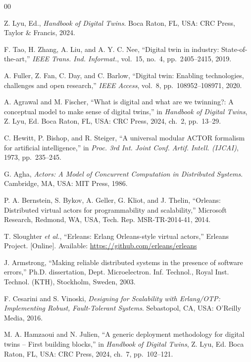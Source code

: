 \documentclass[conference]{IEEEtran}
\begin{document}
\begin{thebibliography}{00}

 Z. Lyu, Ed., \emph{Handbook of Digital Twins}. Boca Raton, FL, USA: CRC Press, Taylor \& Francis, 2024.

 F. Tao, H. Zhang, A. Liu, and A. Y. C. Nee, ``Digital twin in industry: State-of-the-art,'' \emph{IEEE Trans. Ind. Informat.}, vol.~15, no.~4, pp.~2405--2415, 2019.

 A. Fuller, Z. Fan, C. Day, and C. Barlow, ``Digital twin: Enabling technologies, challenges and open research,'' \emph{IEEE Access}, vol.~8, pp.~108952--108971, 2020.

 A. Agrawal and M. Fischer, ``What is digital and what are we twinning?: A conceptual model to make sense of digital twins,'' in \emph{Handbook of Digital Twins}, Z. Lyu, Ed. Boca Raton, FL, USA: CRC Press, 2024, ch.~2, pp.~13--29.

 C. Hewitt, P. Bishop, and R. Steiger, ``A universal modular ACTOR formalism for artificial intelligence,'' in \emph{Proc. 3rd Int. Joint Conf. Artif. Intell. (IJCAI)}, 1973, pp.~235--245.

 G. Agha, \emph{Actors: A Model of Concurrent Computation in Distributed Systems}. Cambridge, MA, USA: MIT Press, 1986.

 P. A. Bernstein, S. Bykov, A. Geller, G. Kliot, and J. Thelin, ``Orleans: Distributed virtual actors for programmability and scalability,'' Microsoft Research, Redmond, WA, USA, Tech. Rep. MSR-TR-2014-41, 2014.

 T. Sloughter \emph{et al.}, ``Erleans: Erlang Orleans-style virtual actors,'' Erleans Project. [Online]. Available: \url{https://github.com/erleans/erleans}

 J. Armstrong, ``Making reliable distributed systems in the presence of software errors,'' Ph.D. dissertation, Dept. Microelectron. Inf. Technol., Royal Inst. Technol. (KTH), Stockholm, Sweden, 2003.

 F. Cesarini and S. Vinoski, \emph{Designing for Scalability with Erlang/OTP: Implementing Robust, Fault-Tolerant Systems}. Sebastopol, CA, USA: O'Reilly Media, 2016.

 M. A. Hamzaoui and N. Julien, ``A generic deployment methodology for digital twins -- First building blocks,'' in \emph{Handbook of Digital Twins}, Z. Lyu, Ed. Boca Raton, FL, USA: CRC Press, 2024, ch.~7, pp.~102--121.


\end{thebibliography}
\end{document}
